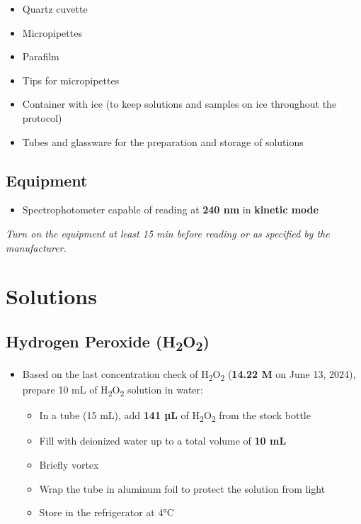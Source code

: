 \documentclass[
  9pt,
  american,
  a5paper,
  extrafontsizes,onecolumn,openright
  ]{memoir}
\providecommand{\tightlist}{%
  \setlength{\itemsep}{0pt}\setlength{\parskip}{0pt}}
\begin{document}
\begin{itemize}
\tightlist
\item
  Quartz cuvette
\item
  Micropipettes
\item
  Parafilm
\item
  Tips for micropipettes
\item
  Container with ice (to keep solutions and samples on ice throughout the protocol)
\item
  Tubes and glassware for the preparation and storage of solutions
\end{itemize}

\subsection{Equipment}\label{equipment}

\begin{itemize}
\tightlist
\item
  Spectrophotometer capable of reading at \textbf{240 nm} in \textbf{kinetic mode}
\end{itemize}

\begin{greybox}[frametitle=Note]
\emph{Turn on the equipment at least 15 min before reading or as specified by the manufacturer.}

\end{greybox}

\section{Solutions}\label{solutions}

\subsection{\texorpdfstring{Hydrogen Peroxide (H\textsubscript{2}O\textsubscript{2})}{Hydrogen Peroxide (H2O2)}}\label{hydrogen-peroxide-h2o2}

\begin{itemize}
\tightlist
\item
  Based on the last concentration check of H\textsubscript{2}O\textsubscript{2} (\textbf{14.22 M} on June 13, 2024), prepare 10 mL of H\textsubscript{2}O\textsubscript{2} solution in water:

  \begin{itemize}
  \tightlist
  \item
    In a tube (15 mL), add \textbf{141 µL} of H\textsubscript{2}O\textsubscript{2} from the stock bottle
  \item
    Fill with deionized water up to a total volume of \textbf{10 mL}
  \item
    Briefly vortex
  \item
    Wrap the tube in aluminum foil to protect the solution from light
  \item
    Store in the refrigerator at 4°C
  \end{itemize}
\end{itemize}
\end{document}
